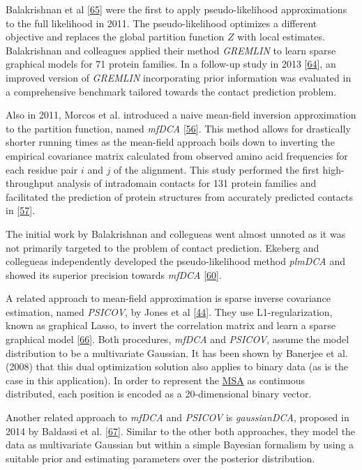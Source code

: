 \documentclass[12pt,a4paper,twoside]{book}
\theoremstyle{definition}
\theoremstyle{definition}
\theoremstyle{remark}
\begin{document}
Balakrishnan et al {[}\protect\hyperlink{ref-Balakrishnan2011}{65}{]}
were the first to apply pseudo-likelihood approximations to the full
likelihood in 2011. The pseudo-likelihood optimizes a different
objective and replaces the global partition function \(Z\) with local
estimates. Balakrishnan and colleagues applied their method
\emph{GREMLIN} to learn sparse graphical models for 71 protein families.
In a follow-up study in 2013
{[}\protect\hyperlink{ref-Kamisetty2013}{64}{]}, an improved version of
\emph{GREMLIN} incorporating prior information was evaluated in a
comprehensive benchmark tailored towards the contact prediction problem.

Also in 2011, Morcos et al. introduced a naive mean-field inversion
approximation to the partition function, named \emph{mfDCA}
{[}\protect\hyperlink{ref-Morcos2011}{56}{]}. This method allows for
drastically shorter running times as the mean-field approach boils down
to inverting the empirical covariance matrix calculated from observed
amino acid frequencies for each residue pair \(i\) and \(j\) of the
alignment. This study performed the first high-throughput analysis of
intradomain contacts for 131 protein families and facilitated the
prediction of protein structures from accurately predicted contacts in
{[}\protect\hyperlink{ref-Marks2011}{57}{]}.

The initial work by Balakrishnan and collegueas went almost unnoted as
it was not primarily targeted to the problem of contact prediction.
Ekeberg and collegueas independently developed the pseudo-likelihood
method \emph{plmDCA} and showed its superior precision towards
\emph{mfDCA} {[}\protect\hyperlink{ref-Ekeberg2013}{60}{]}.

A related approach to mean-field approximation is sparse inverse
covariance estimation, named \emph{PSICOV}, by Jones et al
{[}\protect\hyperlink{ref-Jones2012}{44}{]}. They use L1-regularization,
known as graphical Lasso, to invert the correlation matrix and learn a
sparse graphical model {[}\protect\hyperlink{ref-Friedman2008}{66}{]}.
Both procedures, \emph{mfDCA} and \emph{PSICOV}, assume the model
distribution to be a multivariate Gaussian. It has been shown by
Banerjee et al. (2008) that this dual optimization solution also applies
to binary data (as is the case in this application). In order to
represent the \protect\hyperlink{abbrev}{MSA} as continuous distributed,
each position is encoded as a 20-dimensional binary vector.

Another related approach to \emph{mfDCA} and \emph{PSICOV} is
\emph{gaussianDCA}, proposed in 2014 by Baldassi et al.
{[}\protect\hyperlink{ref-Baldassi2014}{67}{]}. Similar to the other
both approaches, they model the data as multivariate Gaussian but within
a simple Bayesian formalism by using a suitable prior and estimating
parameters over the posterior distribution.
\end{document}
